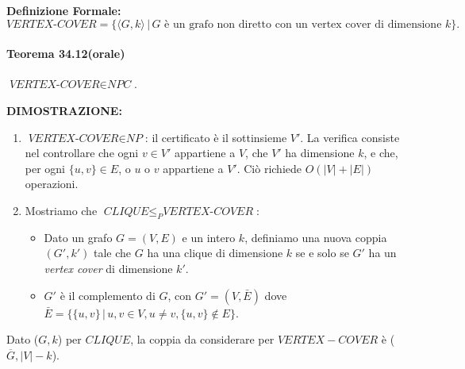 \documentclass{article}
\begin{document}
\textbf{Definizione Formale:}
\[
\textit{VERTEX-COVER} = \{\langle G, k \rangle \,|\, G \text{ è un grafo non diretto con un vertex cover di dimensione } k \}.
\]

\paragraph{Teorema 34.12(orale)}
\label{teorema-34.12}
\vspace{1em}
\text{}
\newline
$\textit{VERTEX-COVER} \in \textit{NPC}$.

\text{}
\newline
\textbf{DIMOSTRAZIONE:}
\begin{enumerate}
    \item $\textit{VERTEX-COVER} \in \textit{NP}$: il certificato è il sottinsieme $V'$. La verifica consiste nel controllare che ogni $v \in V'$ appartiene a $V$, che $V'$ ha dimensione $k$, e che, per ogni $\{u,v\} \in E$, o $u$ o $v$ appartiene a $V'$. Ciò richiede $O(|V| + |E|)$ operazioni.
    \item Mostriamo che $\textit{CLIQUE} \leq_P \textit{VERTEX-COVER}$:
    \begin{itemize}
        \item Dato un grafo $G = (V, E)$ e un intero $k$, definiamo una nuova coppia $(G', k')$ tale che $G$ ha una clique di dimensione $k$ se e solo se $G'$ ha un \textit{vertex cover} di dimensione $k'$.
        \item $G'$ è il complemento di $G$, con $G' = (V, \bar{E})$ dove $\bar{E} = \{\{u,v\} \,|\, u, v \in V, u \neq v, \{u,v\} \notin E\}$.
    \end{itemize}
\end{enumerate}

Dato ($G, k$) per $CLIQUE$, la coppia da considerare per $VERTEX-COVER$ è ($\overline{G}, |V| - k$).
\end{document}
